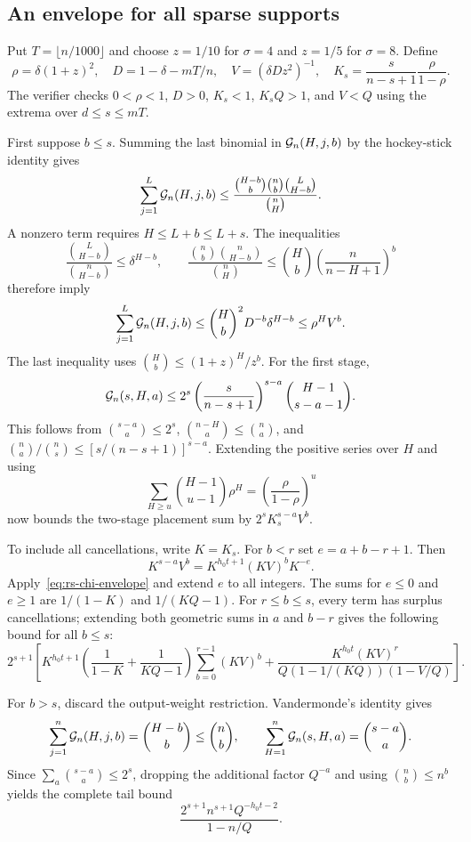\subsection{An envelope for all sparse supports}

Put $T=\lfloor n/1000\rfloor$ and choose $z=1/10$ for $\sigma=4$ and
$z=1/5$ for $\sigma=8$.  Define
\[
 \rho=\delta(1+z)^2,\quad D=1-\delta-mT/n,\quad
 V=(\delta D z^2)^{-1},\quad
 K_s=\frac{s}{n-s+1}\frac{\rho}{1-\rho}.
\]
The verifier checks $0<\rho<1$, $D>0$, $K_s<1$, $K_sQ>1$, and $V<Q$
using the extrema over $d\le s\le mT$.

First suppose $b\le s$.  Summing the last binomial in
$\mathcal G_n(H,j,b)$ by the hockey-stick identity gives
\[
 \sum_{j=1}^L\mathcal G_n(H,j,b)
 \le\frac{\binom{H-b}b\binom nb\binom L{H-b}}{\binom nH}.
\]
A nonzero term requires $H\le L+b\le L+s$.  The inequalities
\[
 \frac{\binom L{H-b}}{\binom n{H-b}}\le\delta^{H-b},\qquad
 \frac{\binom nb\binom n{H-b}}{\binom nH}
 \le\binom Hb\left(\frac n{n-H+1}\right)^b
\]
therefore imply
\begin{equation}
 \sum_{j=1}^L\mathcal G_n(H,j,b)
 \le\binom Hb^2 D^{-b}\delta^{H-b}\le\rho^H V^b.
 \label{eq:rs-second-envelope}
\end{equation}
The last inequality uses $\binom Hb\le(1+z)^H/z^b$.
For the first stage,
\[
 \mathcal G_n(s,H,a)\le
 2^s\left(\frac{s}{n-s+1}\right)^{s-a}
 \binom{H-1}{s-a-1}.
\]
This follows from $\binom{s-a}a\le2^s$,
$\binom{n-H}a\le\binom na$, and
$\binom na/\binom ns\le[s/(n-s+1)]^{s-a}$.
Extending the positive series over $H$ and using
\[
 \sum_{H\ge u}\binom{H-1}{u-1}\rho^H
   =\left(\frac\rho{1-\rho}\right)^u
\]
now bounds the two-stage placement sum by $2^sK_s^{s-a}V^b$.

To include all cancellations, write $K=K_s$.  For $b<r$ set
$e=a+b-r+1$.  Then
\[
 K^{s-a}V^b=K^{h_0t+1}(KV)^bK^{-e}.
\]
Apply~\eqref{eq:rs-chi-envelope} and extend $e$ to all integers.
The sums for $e\le0$ and $e\ge1$ are $1/(1-K)$ and $1/(KQ-1)$.
For $r\le b\le s$, every term has surplus cancellations; extending both
geometric sums in $a$ and $b-r$ gives the following bound for all $b\le s$:
\begin{equation}
 2^{s+1}\left[
 K^{h_0t+1}\left(\frac1{1-K}+\frac1{KQ-1}\right)
       \sum_{b=0}^{r-1}(KV)^b
 +\frac{K^{h_0t}(KV)^r}{Q(1-1/(KQ))(1-V/Q)}
 \right].
 \label{eq:rs-low-b}
\end{equation}

For $b>s$, discard the output-weight restriction.  Vandermonde's identity
gives
\[
 \sum_{j=1}^n\mathcal G_n(H,j,b)=\binom{H-b}b\le\binom nb,
 \qquad \sum_{H=1}^n\mathcal G_n(s,H,a)=\binom{s-a}a.
\]
Since $\sum_a\binom{s-a}a\le2^s$, dropping the additional factor $Q^{-a}$
and using $\binom nb\le n^b$ yields the complete tail bound
\begin{equation}
 \frac{2^{s+1}n^{s+1}Q^{-h_0t-2}}{1-n/Q}.
 \label{eq:rs-high-b}
\end{equation}

